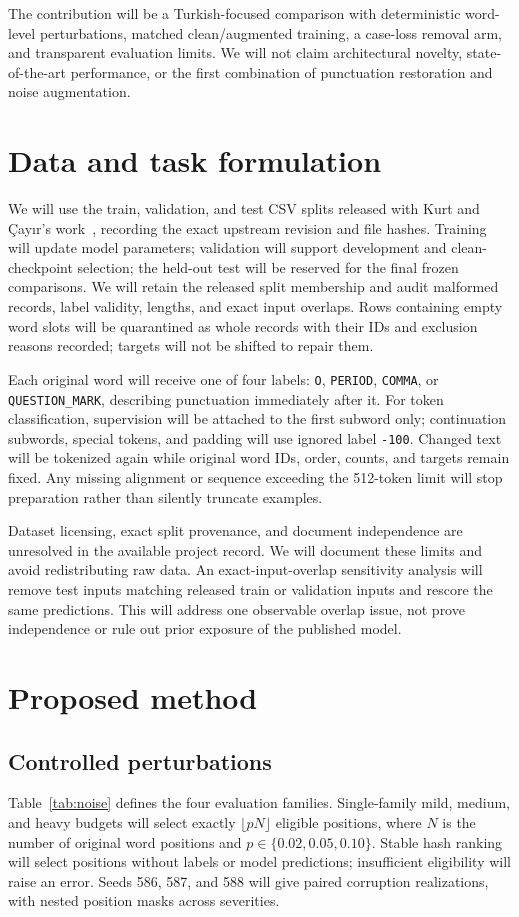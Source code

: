 \documentclass{article}
\begin{document}
The contribution will be a Turkish-focused comparison with deterministic
word-level perturbations, matched clean/augmented training, a case-loss removal
arm, and transparent evaluation limits. We will not claim architectural novelty,
state-of-the-art performance, or the first combination of punctuation restoration
and noise augmentation.

\section{Data and task formulation}
We will use the train, validation, and test CSV splits released with
Kurt and \c{C}ay\i r's work~\cite{kurt2023}, recording the exact upstream revision
and file hashes. Training will update model parameters; validation will support
development and clean-checkpoint selection; the held-out test will be reserved
for the final frozen comparisons. We will retain the released split membership
and audit malformed records, label validity, lengths, and exact input overlaps.
Rows containing empty word slots will be quarantined as whole records with
their IDs and exclusion reasons recorded; targets will not be shifted to
repair them.

Each original word will receive one of four labels:
\texttt{O}, \texttt{PERIOD}, \texttt{COMMA}, or \texttt{QUESTION\_MARK},
describing punctuation immediately after it. For token classification,
supervision will be attached to the first subword only; continuation subwords,
special tokens, and padding will use ignored label \texttt{-100}. Changed text
will be tokenized again while original word IDs, order, counts, and targets
remain fixed. Any missing alignment or sequence exceeding the 512-token limit
will stop preparation rather than silently truncate examples.

Dataset licensing, exact split provenance, and document independence are
unresolved in the available project record. We will document these limits and
avoid redistributing raw data. An exact-input-overlap sensitivity analysis will
remove test inputs matching released train or validation inputs and rescore the
same predictions. This will address one observable overlap issue, not prove
independence or rule out prior exposure of the published model.

\section{Proposed method}
\subsection{Controlled perturbations}
Table~\ref{tab:noise} defines the four evaluation families.
Single-family mild, medium, and heavy budgets will select exactly
$\lfloor pN\rfloor$ eligible positions, where $N$ is the number of original
word positions and $p\in\{0.02,0.05,0.10\}$. Stable hash ranking will select
positions without labels or model predictions; insufficient eligibility will
raise an error. Seeds 586, 587, and 588 will give paired corruption realizations,
with nested position masks across severities.
\end{document}
